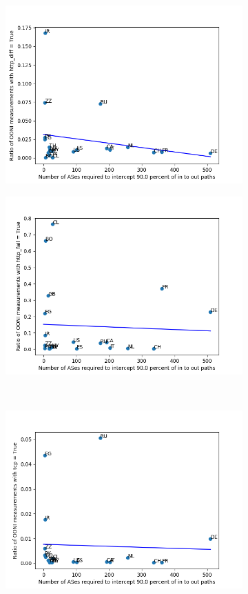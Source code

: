 \documentclass{article}
\begin{document}
\begin{multicols}{2}
\begin{figure}
\begin{subfigure}[b]{0.4\linewidth}
		\includegraphics[width=\linewidth]{http_diff_09}
	\end{subfigure}
	\begin{subfigure}[b]{0.4\linewidth}
		\includegraphics[width=\linewidth]{http_fail_09}
	\end{subfigure}
	\\
	\begin{subfigure}[b]{0.4\linewidth}
		\includegraphics[width=\linewidth]{tcp_09}

\end{subfigure}
\end{figure}
\end{multicols}
\end{document}
